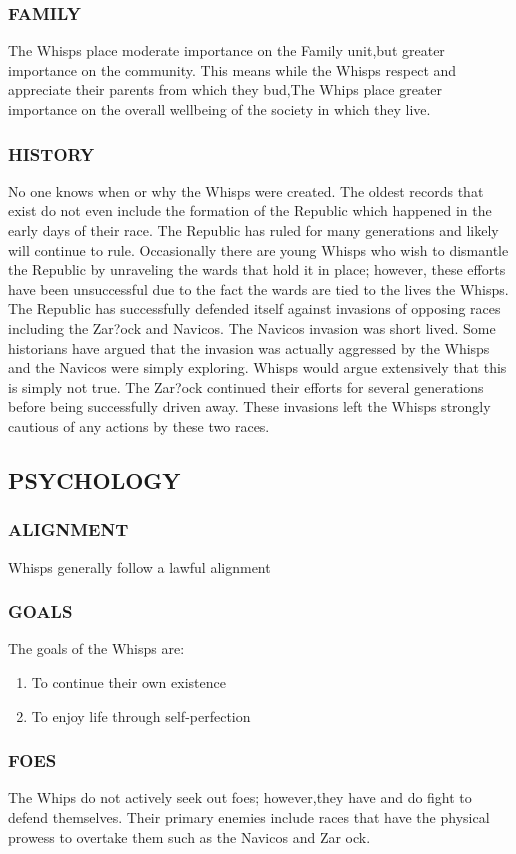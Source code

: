 \subsubsection{FAMILY}
The Whisps place moderate importance on the Family unit,but greater importance on the community.  This means while the Whisps respect and appreciate their parents from which they bud,The Whips place greater importance on the overall wellbeing of the society in which they live.
\subsubsection{HISTORY}
No one knows when or why the Whisps were created.  The oldest records that exist do not even include the formation of the Republic which happened in the early days of their race.  The Republic has ruled for many generations and likely will continue to rule.  Occasionally there are young Whisps who wish to dismantle the Republic by unraveling the wards that hold it in place; however, these efforts have been unsuccessful due to the fact the wards are tied to the lives the Whisps.  The Republic has successfully defended itself against invasions of opposing races including the Zar?ock and Navicos.  The Navicos invasion was short lived.  Some historians have argued that the invasion was actually aggressed by the Whisps and the Navicos were simply exploring.  Whisps would argue extensively that this is simply not true.  The Zar?ock continued their efforts for several generations before being successfully driven away.  These invasions left the Whisps strongly cautious of any actions by these two races.
\subsection{PSYCHOLOGY}
\subsubsection{ALIGNMENT}
Whisps generally follow a lawful alignment
\subsubsection{GOALS}
The goals of the Whisps are:
\begin{enumerate}
\item To continue their own existence
\item To enjoy life through self-perfection
\end{enumerate}
\subsubsection{FOES}
The Whips do not actively seek out foes; however,they have and do fight to defend themselves.  Their primary enemies include races that have the physical prowess to overtake them such as the Navicos and Zar ock.
